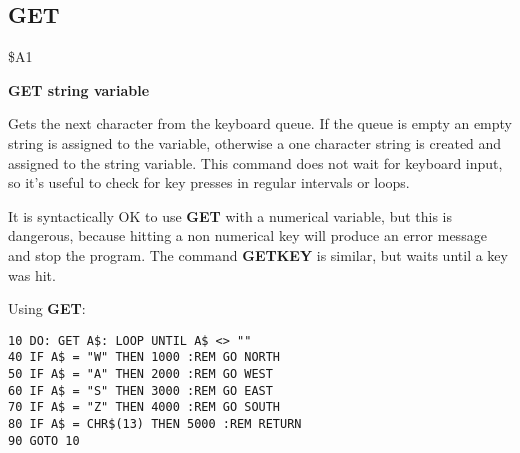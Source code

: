 \subsection{GET}
\begin{description}[leftmargin=2cm,style=nextline]
\item [Token:] \$A1
\item [Format:] {\bf GET string variable}
\item [Usage:] Gets the next character
               from the keyboard queue. If the queue is empty
               an empty string is assigned to the variable,
               otherwise a one character string is created
               and assigned to the string variable.
               This command does not wait for keyboard
               input, so it's useful to check for key presses
               in regular intervals or loops.

\item [Remarks:] It is syntactically OK to use {\bf GET} with
               a numerical variable, but this is dangerous,
               because hitting a non numerical key will produce
               an error message and stop the program.
               The command {\bf GETKEY} is similar, but waits
               until a key was hit.

\item [Example:] Using {\bf GET}:
\begin{tcolorbox}[colback=black,coltext=white]
\verbatimfont{\codefont}
\begin{verbatim}
10 DO: GET A$: LOOP UNTIL A$ <> ""
40 IF A$ = "W" THEN 1000 :REM GO NORTH
50 IF A$ = "A" THEN 2000 :REM GO WEST
60 IF A$ = "S" THEN 3000 :REM GO EAST
70 IF A$ = "Z" THEN 4000 :REM GO SOUTH
80 IF A$ = CHR$(13) THEN 5000 :REM RETURN
90 GOTO 10
\end{verbatim}
\end{tcolorbox}
\end{description}


\newpage
